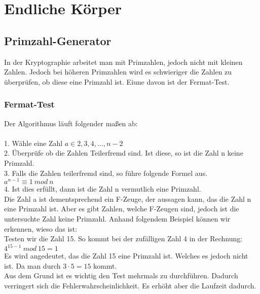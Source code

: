 \chapter{Endliche Körper}

\section{Primzahl-Generator}
In der Kryptographie arbeitet man mit Primzahlen, jedoch nicht mit kleinen Zahlen.
Jedoch bei höheren Primzahlen wird es schwieriger die Zahlen zu überprüfen, ob diese eine Primzahl ist.
Eiune davon ist der Fermat-Test.

\subsection{Fermat-Test}
Der Algorithmus läuft folgender maßen ab:\\
\\
1. Wähle eine Zahl $ a \in {2,3,4,...,n-2}$ \\
2. Überprüfe ob die Zahlen Teilerfremd sind. Ist diese, so ist die Zahl n keine Primzahl.\\
3. Falls die Zahlen teilerfremd sind, so führe folgende Formel aus.\\
$
a^{n-1} \equiv  1\ mod\ n
$\\
4. Ist dies erfüllt, dann ist die Zahl n vermutlich eine Primzahl. 
\\
Die Zahl a ist dementsprechend ein F-Zeuge, der aussagen kann, das die Zahl n eine Primzahl ist.
Aber es gibt Zahlen, welche F-Zeugen sind, jedoch ist die untersuchte Zahl keine Primzahl.
Anhand folgendem Beispiel können wir erkennen, wieso das ist:
\\
Testen wir die Zahl 15. So kommt bei der zufälligen Zahl 4 in der Rechnung: \\
$
4^{15-1}\ mod\ 15 = 1
$\\
Es wird angedeutet, das die Zahl 15 eine Primzahl ist. Welches es jedoch nicht ist. Da man durch $3 \cdot 5 = 15$ kommt.\\
Aus dem Grund ist es wichtig den Test mehrmals zu durchführen. Dadurch verringert sich die Fehlerwahrscheinlichkeit. Es erhöht aber die Laufzeit dadurch.\\

